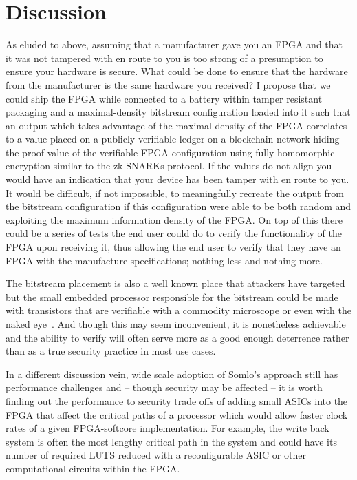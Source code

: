\documentclass[conference]{IEEEtran}
\begin{document}
\section{Discussion}
As eluded to above, assuming that a manufacturer gave you an FPGA and that it was not tampered with en route to you is too strong of a presumption to ensure your hardware is secure. What could be done to ensure that the hardware from the manufacturer is the same hardware you received? I propose that we could ship the FPGA while connected to a battery within tamper resistant packaging and a maximal-density bitstream configuration loaded into it such that an output which takes advantage of the maximal-density of the FPGA correlates to a value placed on a publicly verifiable ledger on a blockchain network hiding the proof-value of the verifiable FPGA configuration using fully homomorphic encryption similar to the zk-SNARKs protocol. If the values do not align you would have an indication that your device has been tamper with en route to you. It would be difficult, if not impossible, to meaningfully recreate the output from the bitstream configuration if this configuration were able to be both random and exploiting the maximum information density of the FPGA. On top of this there could be a series of tests the end user could do to verify the functionality of the FPGA upon receiving it, thus allowing the end user to verify that they have an FPGA with the manufacture specifications; nothing less and nothing more. 

The bitstream placement is also a well known place that attackers have targeted~\cite{swierczynski} but the small embedded processor responsible for the bitstream could be made with transistors that are verifiable with a commodity microscope or even with the naked eye~\cite{monster}. And though this may seem inconvenient, it is nonetheless achievable and the ability to verify will often serve more as a good enough deterrence rather than as a true security practice in most use cases.

In a different discussion vein, wide scale adoption of Somlo’s approach still has performance challenges and – though security may be affected – it is worth finding out the performance to security trade offs of adding small ASICs into the FPGA that affect the critical paths of a processor which would allow faster clock rates of a given FPGA-softcore implementation. For example, the write back system is often the most lengthy critical path in the system and could have its number of required LUTS reduced with a reconfigurable ASIC or other computational circuits within the FPGA.
\end{document}
